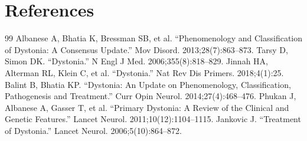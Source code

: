 \section*{References}
\begin{thebibliography}{99}
 Albanese A, Bhatia K, Bressman SB, et al. ``Phenomenology and Classification of Dystonia: A Consensus Update.'' Mov Disord. 2013;28(7):863--873.
 Tarsy D, Simon DK. ``Dystonia.'' N Engl J Med. 2006;355(8):818--829.
 Jinnah HA, Alterman RL, Klein C, et al. ``Dystonia.'' Nat Rev Dis Primers. 2018;4(1):25.
 Balint B, Bhatia KP. ``Dystonia: An Update on Phenomenology, Classification, Pathogenesis and Treatment.'' Curr Opin Neurol. 2014;27(4):468--476.
 Phukan J, Albanese A, Gasser T, et al. ``Primary Dystonia: A Review of the Clinical and Genetic Features.'' Lancet Neurol. 2011;10(12):1104--1115.
 Jankovic J. ``Treatment of Dystonia.'' Lancet Neurol. 2006;5(10):864--872.
\end{thebibliography}
